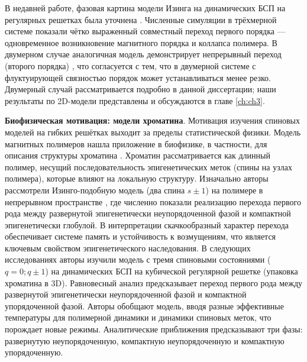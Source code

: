 В недавней работе, фазовая картина модели Изинга на динамических БСП на регулярных решетках была уточнена \cite{PhysRevE.104.024122}. 
Численные симуляции в трёхмерной системе показали чётко выраженный совместный переход первого порядка  --- одновременное возникновение магнитного порядка и коллапса полимера.  
В двумерном случае аналогичная модель демонстрирует непрерывный переход (второго порядка) \cite{PhysRevE.104.024122,faizullina2021critical1}, что согласуется с тем, что в двумерной системе с флуктуирующей связностью порядок может устанавливаться менее резко.
Двумерный случай рассматривается подробно в данной диссертации; наши результаты по 2D-модели представлены и обсуждаются в главе  \ref{ch:ch3}. 





\textbf{Биофизическая мотивация: модели хроматина}. 
 Мотивация изучения спиновых моделей на гибких решётках выходит за пределы  статистической физики. 
 Модель магнитных полимеров нашла приложение в  биофизике, в частности, для описания структуры хроматина  \cite{PhysRevX.6.041047,PhysRevE.100.052410}. 
 Хроматин рассматривается как длинный полимер, несущий последовательность эпигенетических меток (спины на узлах полимера), которые влияют на локальную структуру. 
 Изначально авторы рассмотрели Изинго-подобную модель (два спина $s\pm 1$) на полимере в непрерывном пространстве  \cite{PhysRevX.6.041047}, где численно показали реализацию перехода первого рода между развернутой эпигенетически неупорядоченной фазой и компактной эпигенетически глобулой. 
 В интерпретации скачкообразный  характер перехода обеспечивает системе память и устойчивость к возмущениям, что является ключевым свойством эпигенетического наследования. 
 В следующих исследованиях \cite{PhysRevE.100.052410} авторы изучили модель с тремя спиновыми состояниями ($q=0;q\pm1$) на динамических БСП на кубической регулярной решетке (упаковка хроматина в 3D). 
 Равновесный анализ предсказывает переход  первого рода между развернутой эпигенетически неупорядоченной фазой и компактной упорядоченной фазой.  
 Авторы обобщают модель, вводя разные эффективные температуры для полимерной динамики и динамики спиновых меток, что порождает новые  режимы. Аналитические приближения предсказывают три фазы: развернутую неупорядоченную, компактную неупорядоченную и компактную упорядоченную. 
 

